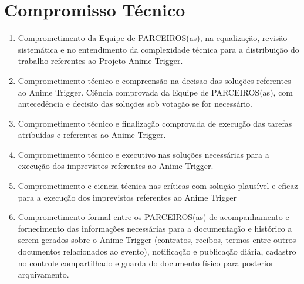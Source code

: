 \documentclass[article]{abntex2}
\begin{document}
\section*{Compromisso Técnico}
\begin{enumerate}
	\item{Comprometimento da Equipe de PARCEIROS(as), na equalização, revisão sistemática e no entendimento da complexidade técnica para a distribuição do trabalho referentes ao Projeto Anime Trigger.}
	\item{Comprometimento técnico e compreensão na decisao das soluções referentes ao Anime Trigger. Ciência comprovada da Equipe de PARCEIROS(as), com antecedência e decisão das soluções sob votação se for necessário.}
	\item{Comprometimento técnico e finalização comprovada de execução das tarefas atribuídas e referentes ao Anime Trigger.}	
	\item{Comprometimento técnico e executivo nas soluções necessárias para a execução dos imprevistos referentes ao Anime Trigger.}
	\item{Comprometimento e ciencia técnica nas críticas com solução plausível e eficaz para a execução dos imprevistos referentes ao Anime Trigger}	
	\item{Comprometimento formal entre os PARCEIROS(as) de acompanhamento e fornecimento das informações necessárias para a documentação e histórico a serem gerados sobre o Anime Trigger (contratos, recibos, termos entre outros documentos relacionados ao evento), notificação e publicação diária, cadastro no controle compartilhado e guarda do documento físico para posterior arquivamento.}
\end{enumerate}







\end{document}
